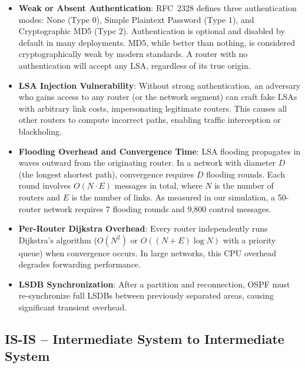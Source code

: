 \documentclass[12pt,a4paper]{article}
\begin{document}
\begin{warningbox}
\begin{itemize}[itemsep=4pt]
  \item \textbf{Weak or Absent Authentication}: RFC~2328 defines three
  authentication modes: None (Type 0), Simple Plaintext Password (Type 1), and
  Cryptographic MD5 (Type 2). Authentication is optional and disabled by default
  in many deployments. MD5, while better than nothing, is considered
  cryptographically weak by modern standards. A router with no authentication
  will accept any LSA, regardless of its true origin.

  \item \textbf{LSA Injection Vulnerability}: Without strong authentication, an
  adversary who gains access to any router (or the network segment) can craft
  fake LSAs with arbitrary link costs, impersonating legitimate routers. This
  causes all other routers to compute incorrect paths, enabling traffic
  interception or blackholing.

  \item \textbf{Flooding Overhead and Convergence Time}: LSA flooding propagates
  in waves outward from the originating router. In a network with diameter $D$
  (the longest shortest path), convergence requires $D$ flooding rounds. Each
  round involves $O(N \cdot E)$ messages in total, where $N$ is the number of
  routers and $E$ is the number of links. As measured in our simulation, a
  50-router network requires 7 flooding rounds and 9,800 control messages.

  \item \textbf{Per-Router Dijkstra Overhead}: Every router independently runs
  Dijkstra's algorithm ($O(N^2)$ or $O((N+E)\log N)$ with a priority queue)
  when convergence occurs. In large networks, this CPU overhead degrades
  forwarding performance.

  \item \textbf{LSDB Synchronization}: After a partition and reconnection, OSPF
  must re-synchronize full LSDBs between previously separated areas, causing
  significant transient overhead.
\end{itemize}
\end{warningbox}

\subsection{IS-IS -- Intermediate System to Intermediate System}
\end{document}
